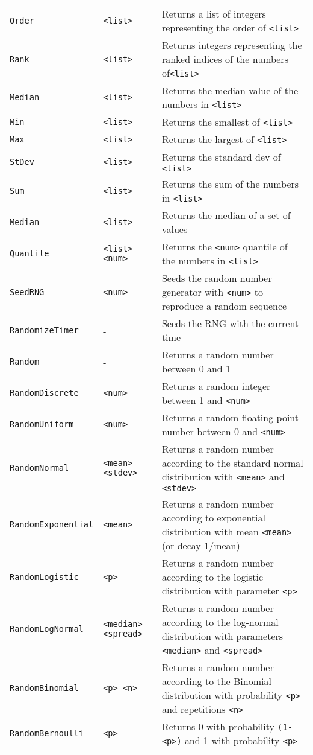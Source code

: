 \begin{longtable}{p{3cm}p{3cm}p{6cm}}
\verb+Order+ &\verb+<list>+ &Returns a list of integers representing the order of \verb+<list>+\\ 
\verb+Rank+ &\verb+<list>+ &Returns integers representing the ranked indices of the numbers of\verb+<list>+\\ 
\verb+Median+ &\verb+<list>+ &Returns the median value of the numbers in \verb+<list>+\\ 
\verb+Min+ &\verb+<list>+ &Returns the smallest of \verb+<list>+\\ 
\verb+Max+ &\verb+<list>+ &Returns the largest of \verb+<list>+\\ 
\verb+StDev+ &\verb+<list>+ &Returns the standard dev of \verb+<list>+ \\ 
\verb+Sum+ &\verb+<list>+ &Returns the sum of the numbers in \verb+<list>+\\ 
\verb+Median+ &\verb+<list>+ &Returns the median of a set of values \\ 
\verb+Quantile+ &\verb+<list> <num>+ &Returns the \verb+<num>+ quantile of the numbers in \verb+<list>+\\ 
\verb+SeedRNG+ &\verb+<num>+ &Seeds the random number generator with \verb+<num>+ to reproduce a random sequence\\ 
\verb+RandomizeTimer+ & - & Seeds the RNG with the current time\\ 
\verb+Random+ & - & Returns a random number between 0 and 1\\ 
\verb+RandomDiscrete+ &\verb+<num>+ &Returns a random integer between 1 and \verb+<num>+ \\ 
\verb+RandomUniform+ &\verb+<num>+ &Returns a random floating-point number between 0 and \verb+<num>+ \\ 
\verb+RandomNormal+ &\verb+<mean> <stdev>+ &Returns a random number according to the standard normal distribution with \verb+<mean>+ and \verb+<stdev>+\\ 
\verb+RandomExponential+ &\verb+<mean>+ &Returns a random number according to exponential distribution with mean \verb+<mean>+ (or decay 1/mean)\\ 
\verb+RandomLogistic+ &\verb+<p>+ &Returns a random number according to the logistic distribution with parameter \verb+<p>+\\ 
\verb+RandomLogNormal+ &\verb+<median> <spread>+ &Returns a random number according to the log-normal distribution with parameters \verb+<median>+ and \verb+<spread>+\\ 
\verb+RandomBinomial+ &\verb+<p> <n>+&Returns a random number according to the Binomial distribution with probability \verb+<p>+ and repetitions \verb+<n>+\\ 
\verb+RandomBernoulli+ &\verb+<p>+ &Returns 0 with probability \verb+(1-<p>)+ and 1 with probability \verb+<p>+\\ 



\end{longtable}
